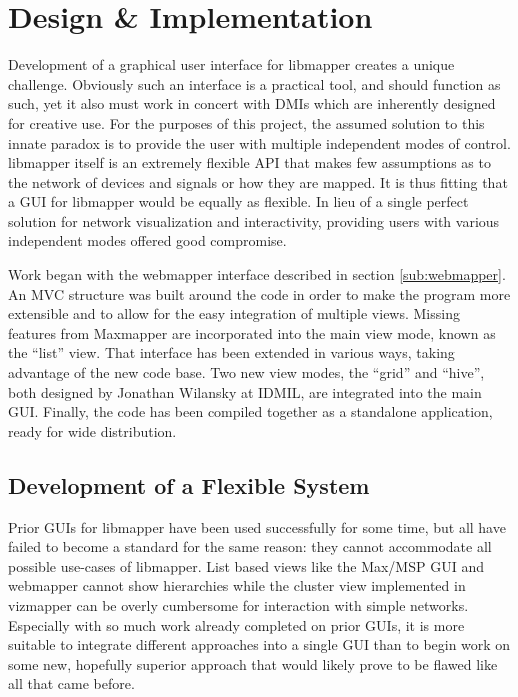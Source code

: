 \chapter{Design \& Implementation}

	Development of a graphical user interface for libmapper creates a unique challenge. Obviously such an interface is a practical tool, and should function as such, yet it also must work in concert with DMIs which are inherently designed for creative use. For the purposes of this project, the assumed solution to this innate paradox is to provide the user with multiple independent modes of control.  libmapper itself is an extremely flexible API that makes few assumptions as to the network of devices and signals or how they are mapped. It is thus fitting that a GUI for libmapper would be equally as flexible. In lieu of a single perfect solution for network visualization and interactivity, providing users with various independent modes offered good compromise.

	Work began with the webmapper interface described in section \ref{sub:webmapper}. An MVC structure was built around the code in order to make the program more extensible and to allow for the easy integration of multiple views. Missing features from Maxmapper are incorporated into the main view mode, known as the ``list'' view. That interface has been extended in various ways, taking advantage of the new code base. Two new view modes, the ``grid'' and ``hive'', both designed by Jonathan Wilansky at IDMIL, are integrated into the main GUI. Finally, the code has been compiled together as a standalone application, ready for wide distribution.

\section{Development of a Flexible System} %
\label{sec:development_of_a_flexible_system}

Prior GUIs for libmapper have been used successfully for some time, but all have failed to become a standard for the same reason: they cannot accommodate all possible use-cases of libmapper. List based views like the Max/MSP GUI and webmapper cannot show hierarchies while the cluster view implemented in vizmapper can be overly cumbersome for interaction with simple networks. Especially with so much work already completed on prior GUIs, it is more suitable to integrate different approaches into a single GUI than to begin work on some new, hopefully superior approach that would likely prove to be flawed like all that came before. 

